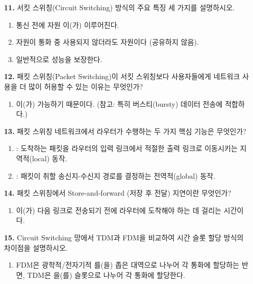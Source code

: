 \documentclass[a4paper, 10pt]{article}
\newcommand{\ansline}[1]{\underline{\hspace{#1}}}
\newcommand{\sectionbox}[1]{
  \vspace{0.5em}
  \noindent\fbox{\textbf{#1}}
  \vspace{0.5em}
}
\begin{document}
\begin{enumerate}[itemsep=2em, leftmargin=2em, label={}]
\item[] \sectionbox{III. 네트워크 코어 및 스위칭 (5문제)}

\item[\textbf{11.}] 서킷 스위칭(Circuit Switching) 방식의 주요 특징 세 가지를 설명하시오.
\begin{enumerate}[label=\alph*., itemsep=0.3em, leftmargin=1.5em]
    \item 통신 전에 자원 \ansline{4cm}이(가) 이루어진다.
    \item 자원이 통화 중 사용되지 않더라도 \ansline{4cm} 자원이다 (공유하지 않음).
    \item 일반적으로 \ansline{4cm} 성능을 보장한다.
\end{enumerate}

\item[\textbf{12.}] 패킷 스위칭(Packet Switching)이 서킷 스위칭보다 사용자들에게 네트워크 사용을 더 많이 허용할 수 있는 이유는 무엇인가?
\begin{enumerate}[label=\alph*., itemsep=0.3em, leftmargin=1.5em]
    \item \ansline{5cm}이(가) 가능하기 때문이다. (참고: 특히 버스티(bursty) 데이터 전송에 적합하다.)
\end{enumerate}

\item[\textbf{13.}] 패킷 스위칭 네트워크에서 라우터가 수행하는 두 가지 핵심 기능은 무엇인가?
\begin{enumerate}[label=\alph*., itemsep=0.3em, leftmargin=1.5em]
    \item \ansline{3cm}: 도착하는 패킷을 라우터의 입력 링크에서 적절한 출력 링크로 이동시키는 지역적(local) 동작.
    \item \ansline{3cm}: 패킷이 취할 송신지-수신지 경로를 결정하는 전역적(global) 동작.
\end{enumerate}

\item[\textbf{14.}] 패킷 스위칭에서 Store-and-forward (저장 후 전달) 지연이란 무엇인가?
\begin{enumerate}[label=\alph*., itemsep=0.3em, leftmargin=1.5em]
    \item \ansline{5cm}이(가) 다음 링크로 전송되기 전에 라우터에 도착해야 하는 데 걸리는 시간이다.
\end{enumerate}

\item[\textbf{15.}] Circuit Switching 망에서 TDM과 FDM을 비교하여 시간 슬롯 할당 방식의 차이점을 설명하시오.
\begin{enumerate}[label=\alph*., itemsep=0.3em, leftmargin=1.5em]
    \item FDM은 광학적/전자기적 \ansline{3cm}를(을) 좁은 대역으로 나누어 각 통화에 할당하는 반면, TDM은 \ansline{3cm}을(를) 슬롯으로 나누어 각 통화에 할당한다.
\end{enumerate}



\end{enumerate}
\end{document}
